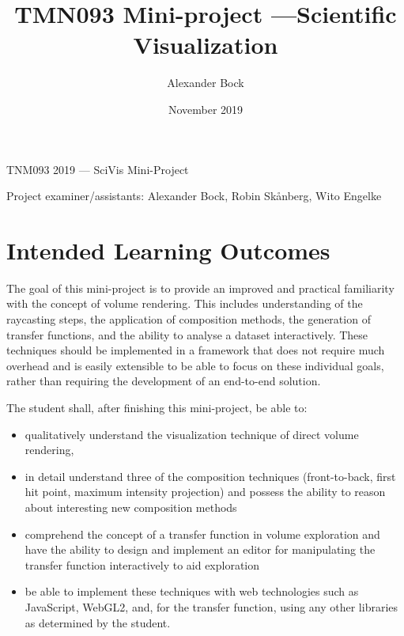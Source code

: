 \documentclass{labinstructions}
\begin{document}
\setcounter{page}{1}

\pagestyle{empty}


%
%
\begin{center}
{\Huge TNM093 2019 --- SciVis Mini-Project}
\vspace{0.6cm}

\Large{Project examiner/assistants: Alexander Bock, Robin Sk\aa nberg, Wito Engelke}
\end{center}

\title{TMN093 Mini-project ---Scientific Visualization}
\author{Alexander Bock}
\date{November 2019}

\pagestyle{fancy}
\fancyfoot[c]{}
\fancyfoot[R]{\thepage}

\section{Intended Learning Outcomes}
The goal of this mini-project is to provide an improved and practical familiarity with the concept of volume rendering.  This includes understanding of the raycasting steps, the application of composition methods, the generation of transfer functions, and the ability to analyse a dataset interactively.  These techniques should be implemented in a framework that does not require much overhead and is easily extensible to be able to focus on these individual goals, rather than requiring the development of an end-to-end solution.

The student shall, after finishing this mini-project, be able to:
\begin{itemize}
  \item qualitatively understand the visualization technique of direct volume rendering,
  \item in detail understand three of the composition techniques (front-to-back, first hit point, maximum intensity projection) and possess the ability to reason about interesting new composition methods
  \item comprehend the concept of a transfer function in volume exploration and have the ability to design and implement an editor for manipulating the transfer function interactively to aid exploration
  \item be able to implement these techniques with web technologies such as JavaScript, WebGL2, and, for the transfer function, using any other libraries as determined by the student.
\end{itemize}{}
\end{document}
